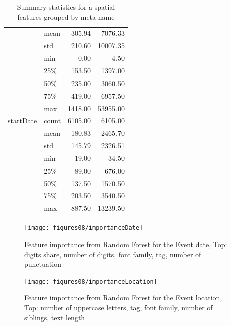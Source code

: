 \begin{table}
\begin{center}
\begin{tabular}{llrr}
            & mean &     305.94 &    7076.33 \\
            & std &     210.60 &   10007.35 \\
            & min &       0.00 &       4.50 \\
            & 25\% &     153.50 &    1397.00 \\
            & 50\% &     235.00 &    3060.50 \\
            & 75\% &     419.00 &    6957.50 \\
            & max &    1418.00 &   53955.00 \\
startDate & count &    6105.00 &    6105.00 \\
            & mean &     180.83 &    2465.70 \\
            & std &     145.79 &    2326.51 \\
            & min &      19.00 &      34.50 \\
            & 25\% &      89.00 &     676.00 \\
            & 50\% &     137.50 &    1570.50 \\
            & 75\% &     203.50 &    3540.50 \\
            & max &     887.50 &   13239.50 \\
\bottomrule
\end{tabular}

\caption{Summary statistics for a spatial features grouped by meta name}
\label{table:spatialDistr}
\end{center}
\end{table}  


\begin{figure}[h]
\begin{center}
\texttt{[image: figures08/importanceDate]}
\caption{Feature importance from Random Forest for the Event date, Top: digits share, number of digits, font family, tag, number of punctuation}
\label{fig:importanceDate}
\end{center}
\end{figure}

\begin{figure}[h]
\begin{center}
\texttt{[image: figures08/importanceLocation]}
\caption{Feature importance from Random Forest for the Event location, Top: number of uppercase letters, tag, font family, number of siblings, text length}
\label{fig:importanceLocation}
\end{center}
\end{figure}

